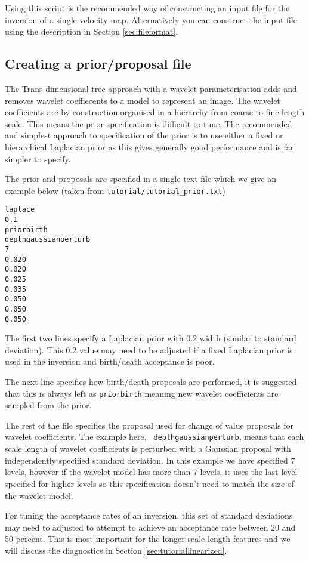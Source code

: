 \documentclass[a4paper,12pt]{article}
\begin{document}
Using this script is the recommended way of constructing an input file
for the inversion of a single velocity map. Alternatively you can
construct the input file using the description in Section \ref{sec:fileformat}.

\subsection{Creating a prior/proposal file}

The Trans-dimensional tree approach with a wavelet parameterisation adds and removes
wavelet coeffiecents to a model to represent an image. The wavelet coefficients are
by construction organised in a hierarchy from coarse to fine length scale. This
means the prior specification is difficult to tune. The recommended and simplest
approach to specification of the prior is to use either a fixed or hierarchical
Laplacian prior as this gives generally good performance and is far simpler to
specify.

The prior and proposals are specified in a single text file which we give
an example below (taken from {\tt tutorial/tutorial\_prior.txt})

\begin{verbatim}
laplace
0.1
priorbirth
depthgaussianperturb
7
0.020
0.020
0.025
0.035
0.050
0.050
0.050
\end{verbatim}

The first two lines specify a Laplacian prior with 0.2 width (similar to standard
deviation). This 0.2 value may need to be adjusted if a fixed Laplacian prior is
used in the inversion and birth/death acceptance is poor.

The next line specifies how birth/death proposals are performed, it is
suggested that this is always left as {\tt priorbirth} meaning new
wavelet coefficients are sampled from the prior.

The rest of the file specifies the proposal used for change of value
proposals for wavelet coefficients. The example here, {\tt
  depthgaussianperturb}, means that each scale length of wavelet
coefficients is perturbed with a Gaussian proposal with independently
specified standard deviation. In this example we have specified 7
levels, however if the wavelet model has more than 7 levels, it uses
the last level specified for higher levels so this specification
doesn't need to match the size of the wavelet model.

For tuning the acceptance rates of an inversion, this set of standard
deviations may need to adjusted to attempt to achieve an acceptance
rate between 20 and 50 percent. This is most important for the longer
scale length features and we will discuss the diagnostics in Section
\ref{sec:tutoriallinearized}.
\end{document}
